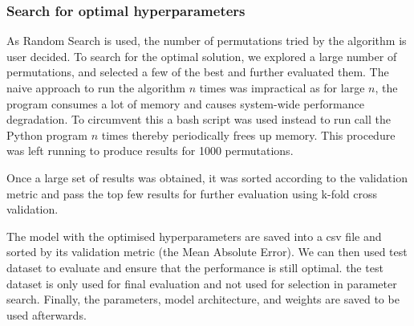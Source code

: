 \documentclass{article}
\begin{document}
\subsubsection{Search for optimal hyperparameters}

As Random Search is used, the number of permutations tried by the algorithm is user decided. To search for the optimal solution, we explored a large number of permutations, and selected a few of the best and further evaluated them. The naive approach to run the algorithm $n$ times was impractical as for large $n$, the program consumes a lot of memory and causes system-wide performance degradation. To circumvent this a bash script was used instead to run call the Python program $n$ times thereby periodically frees up memory. This procedure was left running to produce results for 1000 permutations. 

Once a large set of results was obtained, it was sorted according to the validation metric and pass the top few results for further evaluation using k-fold cross validation.

The model with the optimised hyperparameters are saved into a csv file and sorted by its validation metric (the Mean Absolute Error). We can then used test dataset to evaluate and ensure that the performance is still optimal. the test dataset is only used for final evaluation and not used for selection in parameter search. Finally, the parameters, model architecture, and weights are saved to be used afterwards.
\end{document}
